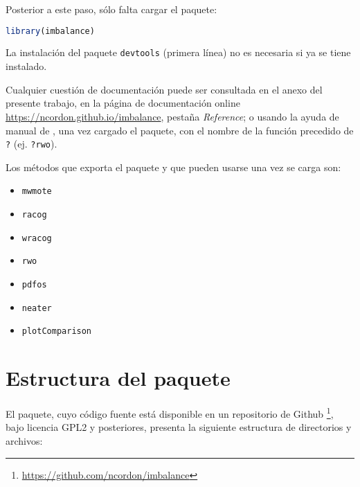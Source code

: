 Posterior a este paso, sólo falta cargar el paquete:

  \begin{lstlisting}[language=R,numbers=none]
  library(imbalance)
  \end{lstlisting}

La instalación del paquete \texttt{devtools} (primera línea) no es necesaria si ya se tiene instalado.

Cualquier cuestión de documentación puede ser consultada en el anexo del presente trabajo, en la página
de documentación online \url{https://ncordon.github.io/imbalance}, pestaña \textit{Reference}; o usando la 
ayuda de manual de \R, una vez cargado el paquete, con el nombre de la función precedido de \texttt{?} (ej. \texttt{?rwo}).


Los métodos que exporta el paquete y que pueden usarse una vez
se carga son:

\begin{itemize}
 \item \texttt{mwmote}
 \item \texttt{racog}
 \item \texttt{wracog}
 \item \texttt{rwo}
 \item \texttt{pdfos}
 \item \texttt{neater}
 \item \texttt{plotComparison}
\end{itemize}

\section{Estructura del paquete}
El paquete, cuyo código fuente está disponible en un repositorio de Github \footnote{\url{https://github.com/ncordon/imbalance}}, 
bajo licencia GPL2 y posteriores, presenta la siguiente estructura de directorios y archivos:

